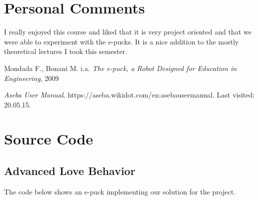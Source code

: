 \documentclass[12pt,a4paper]{article}
\begin{document}
\section*{Personal Comments}
I really enjoyed this course and liked that it is very project oriented and that we were able to experiment with the e-pucks. It is a nice addition to the mostly theoretical lectures I took this semester. 

\begin{thebibliography}{20}
Mondada F., Bonani M. i.a.
\textit{The e-puck, a Robot Designed for Education in Engineering}, 2009

\textit{Aseba User Manual}.										%
https://aseba.wikidot.com/en:asebausermanual.			%
Last visited: 20.05.15.									%
\end{thebibliography}
\appendix
\renewcommand{\thesection}{Appendix \Alph{section}}
\renewcommand{\thesubsection}{\Alph{section}.\arabic{subsection}}

\clearpage

\section{Source Code} \label{app:sourceCode}

\subsection{Advanced Love Behavior} \label{app:advLove} %
The code below shows an e-puck implementing our solution for the project.


\end{document}
